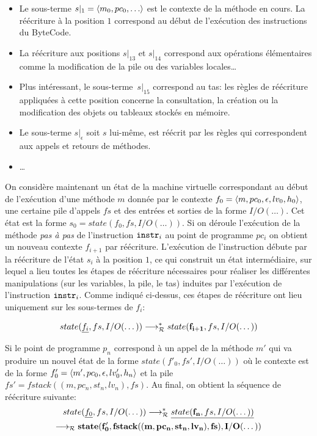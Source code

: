 \begin{itemize}
\item Le sous-terme $s|_1 = \la m_0, pc_0, \dots \ra$ est le contexte
  de la méthode en cours. La réécriture à la position $1$ correspond au début de
  l'exécution des instructions du ByteCode.

\item La réécriture aux positions $s|_{13}$ et $s|_{14}$ correspond
  aux opérations élémentaires comme la modification de la pile ou des
  variables locales\dots
  
\item Plus intéressant, le sous-terme~$s|_{15}$ correspond au tas: les
  règles de réécriture appliquées à cette position concerne la
  consultation, la création ou la modification des objets ou tableaux
  stockés en mémoire.

\item Le sous-terme $s|_\epsilon$ soit $s$ lui-même, est réécrit par les
  règles qui correspondent aux appels et retours de méthodes.
\item \dots
\end{itemize}

On considère maintenant un état de la machine virtuelle correspondant
au début de l'exécution d'une méthode $m$ donnée par le contexte $f_0 =
\langle m, pc_0, \epsilon, lv_0, h_0\rangle$, une certaine pile d'appels $fs$
et des entrées et sorties de la forme $I/O(\dots)$.  Cet état est la
forme $s_0 = state(f_0, fs, I/O(\dots))$. Si on déroule l'exécution de
la méthode \emph{pas à pas} de l'instruction $\mathtt{instr}_i$ au point de
programme $pc_i$ on obtient un nouveau contexte $f_{i+1}$ par
réécriture. L'exécution de l'instruction débute par la réécriture de
l'état $s_i$ à la position $1$, ce qui construit un état intermédiaire, sur
lequel a lieu toutes les étapes de réécriture nécessaires pour
réaliser les différentes manipulations (sur les variables, la pile, le
tas) induites par l'exécution de l'instruction $\mathtt{instr}_i$. Comme
indiqué ci-dessus, ces étapes de réécriture ont lieu uniquement sur
les sous-termes de $f_i$: %

\[ state(\underline{f_i}, fs, I/O(\dots)) \longrightarrow_\mathcal R^* state(\mathbf{f_{i+1}}, fs, I/O(\dots)) \]

Si le point de programme $p_n$ correspond à un appel de la méthode
$m'$ qui va produire un nouvel état de la forme $state(f'_0, fs',
I/O(\dots))$ où le contexte est de la forme $f'_0 = \langle m', pc_0,
\epsilon, lv'_0, h_n \rangle$ et la pile $fs' = fstack((m, pc_n, st_n,
lv_n), fs)$. Au final, on obtient la séquence de réécriture suivante:
\begin{multline*}
  state(\underline{f_0}, fs, I/O(\dots)) \longrightarrow_\mathcal R^* \underline{state(\mathbf{f_n}, fs, I/O(\dots))} \\
  \longrightarrow_\mathcal R \mathbf{state(f'_0, fstack((m, pc_n, st_n, lv_n), fs), I/O(\dots))}  
\end{multline*}

